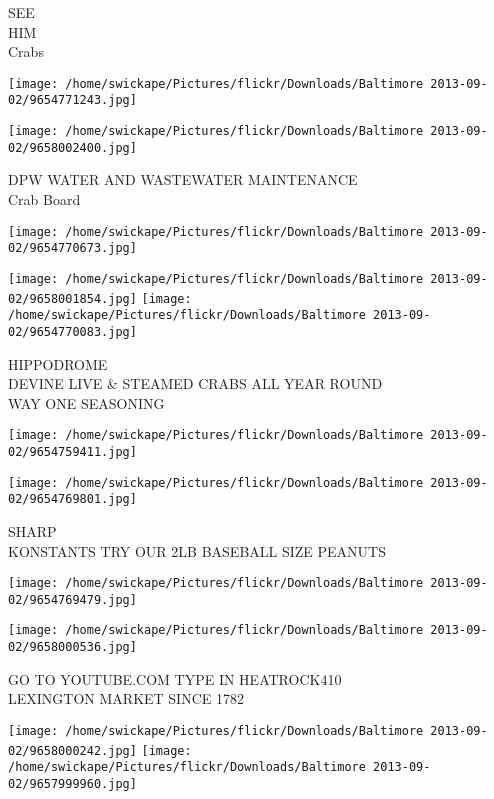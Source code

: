 \documentclass[10pt,letterpaper]{article}
\begin{document}
SEE\\
HIM\\
Crabs
\pagebreak

\texttt{[image: /home/swickape/Pictures/flickr/Downloads/Baltimore 2013-09-02/9654771243.jpg]}

\vspace{0.25in}
\texttt{[image: /home/swickape/Pictures/flickr/Downloads/Baltimore 2013-09-02/9658002400.jpg]}

DPW WATER AND WASTEWATER MAINTENANCE\\
Crab Board
\pagebreak

\texttt{[image: /home/swickape/Pictures/flickr/Downloads/Baltimore 2013-09-02/9654770673.jpg]}

\vspace{0.25in}
\texttt{[image: /home/swickape/Pictures/flickr/Downloads/Baltimore 2013-09-02/9658001854.jpg]}
\texttt{[image: /home/swickape/Pictures/flickr/Downloads/Baltimore 2013-09-02/9654770083.jpg]}

HIPPODROME\\
DEVINE LIVE \& STEAMED CRABS ALL YEAR ROUND\\
WAY ONE SEASONING
\pagebreak

\texttt{[image: /home/swickape/Pictures/flickr/Downloads/Baltimore 2013-09-02/9654759411.jpg]}

\vspace{0.25in}
\texttt{[image: /home/swickape/Pictures/flickr/Downloads/Baltimore 2013-09-02/9654769801.jpg]}

SHARP\\
KONSTANTS TRY OUR 2LB BASEBALL SIZE PEANUTS
\pagebreak

\texttt{[image: /home/swickape/Pictures/flickr/Downloads/Baltimore 2013-09-02/9654769479.jpg]}

\vspace{0.25in}
\texttt{[image: /home/swickape/Pictures/flickr/Downloads/Baltimore 2013-09-02/9658000536.jpg]}

GO TO YOUTUBE.COM TYPE IN HEATROCK410\\
LEXINGTON MARKET SINCE 1782
\pagebreak

\texttt{[image: /home/swickape/Pictures/flickr/Downloads/Baltimore 2013-09-02/9658000242.jpg]}
\texttt{[image: /home/swickape/Pictures/flickr/Downloads/Baltimore 2013-09-02/9657999960.jpg]}
\end{document}
